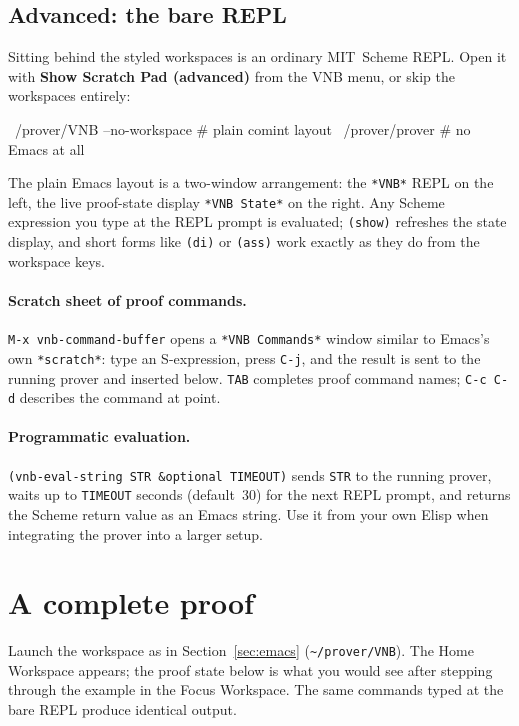 \subsection{Advanced: the bare REPL}

Sitting behind the styled workspaces is an ordinary MIT~Scheme
REPL.  Open it with \textbf{Show Scratch Pad (advanced)} from the VNB
menu, or skip the workspaces entirely:

\begin{VNBsnip}
~/prover/VNB --no-workspace       # plain comint layout
~/prover/prover                   # no Emacs at all
\end{VNBsnip}

\noindent
The plain Emacs layout is a two-window arrangement: the
\texttt{*VNB*} REPL on the left, the live proof-state display
\texttt{*VNB State*} on the right.  Any Scheme expression you type
at the REPL prompt is evaluated; \texttt{(show)} refreshes the
state display, and short forms like \texttt{(di)} or \texttt{(ass)}
work exactly as they do from the workspace keys.

\paragraph{Scratch sheet of proof commands.}
\texttt{M-x vnb-command-buffer} opens a \texttt{*VNB Commands*}
window similar to Emacs's own \texttt{*scratch*}: type an
S-expression, press \texttt{C-j}, and the result is sent to the
running prover and inserted below.  \texttt{TAB} completes proof
command names; \texttt{C-c C-d} describes the command at point.

\paragraph{Programmatic evaluation.}
\texttt{(vnb-eval-string STR \&optional TIMEOUT)} sends \texttt{STR}
to the running prover, waits up to \texttt{TIMEOUT} seconds
(default~30) for the next REPL prompt, and returns the Scheme
return value as an Emacs string.  Use it from your own Elisp when
integrating the prover into a larger setup.

\section{A complete proof}
\label{sec:quickstart}

\begin{sloppypar}
Launch the workspace as in Section~\ref{sec:emacs} (\texttt{\textasciitilde/prover/VNB}).
The Home Workspace appears; the proof state below is what you would
see after stepping through the example in the Focus Workspace.  The
same commands typed at the bare REPL produce identical output.
\end{sloppypar}

